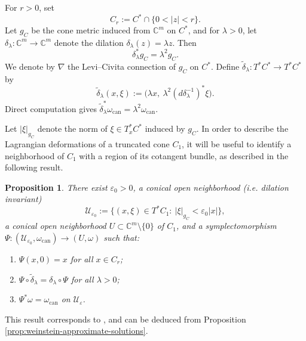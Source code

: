 \documentclass[11pt]{amsart}
\newtheorem{proposition}{Proposition}
\theoremstyle{definition}
\theoremstyle{remark}
\newcommand{\C}{\mathbb{C}}
\begin{document}
For $r>0$, set 
\[
C_{r}:=C^*\cap\{0<|z|<r\}.
\]
Let $g_C$ be the cone metric induced from $\C^m$ on $C^\ast$, and for $\lambda>0$, let $\delta_\lambda:\mathbb C^m\to \mathbb C^m$ denote the dilation $\delta_\lambda(z)=\lambda z$. Then
\[
\delta_\lambda^\ast g_C=\lambda^2 g_C.
\]
We denote by $\nabla$ the Levi--Civita connection of $g_C$ on $C^\ast$. Define $\tilde\delta_\lambda:T^\ast C^\ast\to T^\ast C^\ast$ by
\[
\tilde\delta_\lambda(x,\xi):=\bigl(\lambda x,\ \lambda^2(d\delta_\lambda^{-1})^\ast\xi\bigr).
\]
Direct computation gives $\tilde\delta_\lambda^\ast\omega_{\mathrm{can}}=\lambda^2\omega_{\mathrm{can}}$.

Let $|\xi|_{g_C}$ denote the norm of $\xi\in T_x^\ast C^\ast$ induced by $g_C$. In order to describe the Lagrangian deformations of a truncated cone $C_1$, it will be useful to identify a neighborhood of $C_1$ with a region of its cotangent bundle, as described in the following result.
\begin{proposition}\label{prop:weinstein}
There exist $\varepsilon_0>0$, a conical open neighborhood (i.e. dilation invariant) 
\[
\mathcal{U}_{\varepsilon_0} := \{(x,\xi)\in T^\ast C_{1}:\ |\xi|_{g_C}<\varepsilon_0 \lvert x\rvert\},
\]
a conical open neighborhood $U\subset \C^m\setminus\{0\}$ of $C_{1}$, and a symplectomorphism
$\Psi:(\mathcal{U}_{\varepsilon_0},\omega_{\mathrm{can}})\to (U,\omega)$
such that:
\begin{enumerate}
\item $\Psi(x,0)=x$ for all $x\in C_{r}$;
\item $\Psi\circ \tilde\delta_\lambda = \delta_\lambda\circ \Psi$ for all $\lambda>0$;
\item $\Psi^\ast\omega=\omega_{\mathrm{can}}$ on $\mathcal{U}_\varepsilon$.
\end{enumerate}
\end{proposition}
This result corresponds to \cite[Theorem 4.3]{joyce-1}, and can be deduced from Proposition \ref{prop:weinstein-approximate-solutions}.
\end{document}
